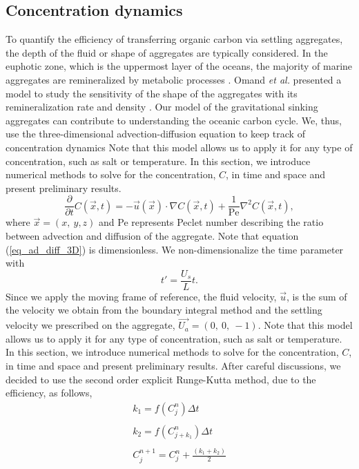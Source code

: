 \subsection{Concentration dynamics}
To quantify the efficiency of transferring organic carbon via settling aggregates, the depth of the fluid or shape of aggregates are typically considered.
In the euphotic zone, which is the uppermost layer of the oceans, the majority of marine aggregates are remineralized by metabolic processes \cite{henson_global_2012}. Omand {\it{et al.}} presented a model to study the sensitivity of the shape of the aggregates with its remineralization rate and density \cite{omand_sinking_2020}. 
Our model of the gravitational sinking aggregates can contribute to understanding the oceanic carbon cycle. We, thus, use the three-dimensional advection-diffusion equation to keep track of concentration dynamics
Note that this model allows us to apply it for any type of concentration, such as salt or temperature. 
In this section, we introduce numerical methods to solve for the concentration, $C$, in time and space and present preliminary results.
\begin{equation}
	\frac{\partial  }{\partial t} C(\vec{x}, t)
	= -\vec{u}(\vec{x}) \cdot \nabla C(\vec{x}, t)
	+ \frac{1}{\text{Pe}} \nabla^2 C(\vec{x}, t),
	\label{eq_ad_diff_3D}
\end{equation}
where $\vec{x} = (x, \ y, z)$ and Pe represents Peclet number describing the ratio between advection and diffusion of the aggregate. 
Note that equation (\ref{eq_ad_diff_3D}) is dimensionless. We non-dimensionalize the time parameter with 
\[
t' = \frac{U_s}{L} t.
\]
Since we apply the moving frame of reference, the fluid velocity, $\vec{u}$, is the sum of the velocity we obtain from the boundary integral method and the settling velocity we prescribed on the aggregate, $\vec{U_a} = (0, \ 0, \ -1)$.
Note that this model allows us to apply it for any type of concentration, such as salt or temperature. 
In this section, we introduce numerical methods to solve for the concentration, $C$, in time and space and present preliminary results.
After careful discussions, we decided to use the second order explicit Runge-Kutta method, due to the efficiency, as follows,
\begin{align}
	k_1 =  f \left( C_j^{n} \right) \Delta t \\ \nonumber
	\\ 
	k_2 = f \left(C_{j+k_1}^{n} \right) \Delta t\\ \nonumber
	\\ 
	C_j^{n+1} = C_j^{n} + \frac{\left(k_1 + k_2 \right)}{2}
\end{align}
